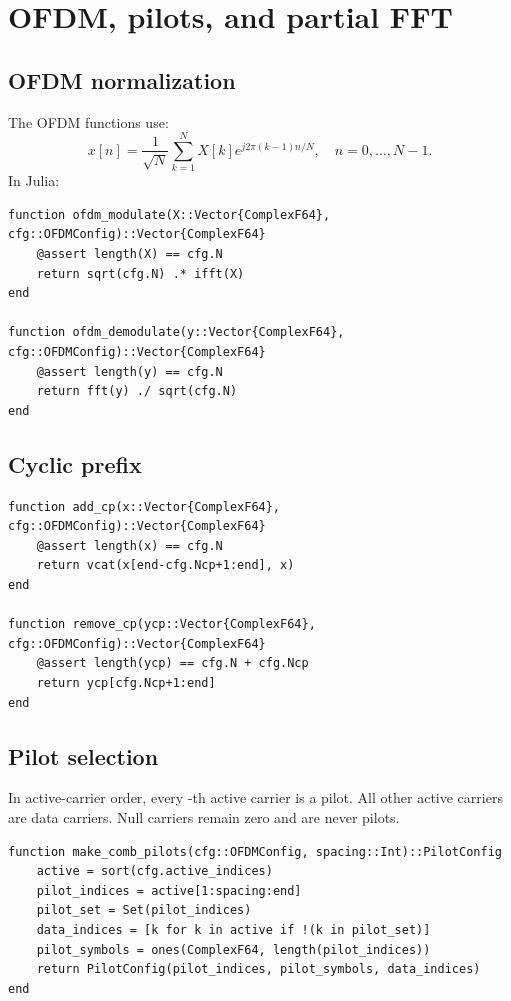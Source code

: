 \documentclass[11pt]{article}
\newcommand{\code}[1]{\texttt{\detokenize{#1}}}
\begin{document}
\clearpage
\section{OFDM, pilots, and partial FFT}

\subsection{OFDM normalization}

The OFDM functions use:
\begin{equation}
x[n]=\frac{1}{\sqrt{N}}\sum_{k=1}^N X[k]e^{j2\pi(k-1)n/N},\quad n=0,\ldots,N-1.
\end{equation}
In Julia:
\begin{lstlisting}
function ofdm_modulate(X::Vector{ComplexF64}, cfg::OFDMConfig)::Vector{ComplexF64}
    @assert length(X) == cfg.N
    return sqrt(cfg.N) .* ifft(X)
end

function ofdm_demodulate(y::Vector{ComplexF64}, cfg::OFDMConfig)::Vector{ComplexF64}
    @assert length(y) == cfg.N
    return fft(y) ./ sqrt(cfg.N)
end
\end{lstlisting}

\subsection{Cyclic prefix}

\begin{lstlisting}
function add_cp(x::Vector{ComplexF64}, cfg::OFDMConfig)::Vector{ComplexF64}
    @assert length(x) == cfg.N
    return vcat(x[end-cfg.Ncp+1:end], x)
end

function remove_cp(ycp::Vector{ComplexF64}, cfg::OFDMConfig)::Vector{ComplexF64}
    @assert length(ycp) == cfg.N + cfg.Ncp
    return ycp[cfg.Ncp+1:end]
end
\end{lstlisting}

\subsection{Pilot selection}

In active-carrier order, every \code{PILOT_SPACING}-th active carrier is a pilot. All other active carriers are data carriers. Null carriers remain zero and are never pilots.

\begin{lstlisting}
function make_comb_pilots(cfg::OFDMConfig, spacing::Int)::PilotConfig
    active = sort(cfg.active_indices)
    pilot_indices = active[1:spacing:end]
    pilot_set = Set(pilot_indices)
    data_indices = [k for k in active if !(k in pilot_set)]
    pilot_symbols = ones(ComplexF64, length(pilot_indices))
    return PilotConfig(pilot_indices, pilot_symbols, data_indices)
end
\end{lstlisting}
\end{document}
